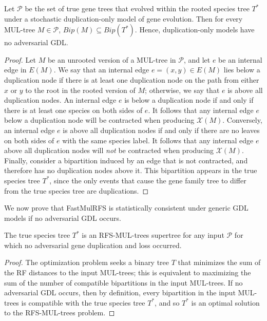 \begin{lemma}
\label{lem:dup}
Let $\mathcal{P}$ be the set of true gene trees that evolved within the rooted species tree $T^*$ under a stochastic duplication-only model of gene evolution.
Then for every MUL-tree $M \in \mathcal{P}$, $Bip(M) \subseteq Bip(T^*)$.
Hence, duplication-only models have no adversarial GDL.
\end{lemma}

\begin{proof}
Let $M$ be an unrooted version of a MUL-tree in $\mathcal{P}$, and let $e$ be an internal edge in $E(M)$.
We say that an internal edge $e = (x,y) \in E(M)$ lies below a duplication node if there is at least one duplication node on the path from either $x$ or $y$ to the root in the rooted version of $M$; otherwise, we say that $e$ is above all duplication nodes.
An internal edge $e$ is below a duplication node if and only if there is at least one species on both sides of $e$. 
It follows that any internal edge $e$ below a duplication node will be contracted when producing $\mathcal{X}(M)$.
Conversely, an internal edge $e$ is above all duplication nodes if and only if there are no leaves on both sides of $e$ with the same species label.
It follows that any internal edge $e$ above all duplication nodes will {\em not} be contracted when producing $\mathcal{X}(M)$.
Finally, consider a bipartition induced by an edge that is not contracted, and therefore has no duplication nodes above it.
This bipartition appears in the true species tree $T^*$, since the only events that cause the gene family tree to differ from the true species tree are duplications.
\end{proof}

We now prove that FastMulRFS is statistically consistent under generic GDL models if no adversarial GDL occurs.

\begin{theorem}
\label{thm:opt}
The true species tree $T^*$ is an RFS-MUL-trees supertree for any input $\mathcal{P}$ for which no adversarial gene duplication and loss occurred.
\end{theorem}
\begin{proof}
The optimization problem seeks a binary tree $T$ that minimizes the sum of the RF distances to the input MUL-trees; this is equivalent to maximizing the sum of the number of compatible bipartitions in the input MUL-trees. 
If no adversarial GDL occurs, then by definition, every bipartition in the input MUL-trees is compatible with the true species tree $T^*$, and so $T^*$ is an optimal solution to the RFS-MUL-trees problem.
\end{proof}

